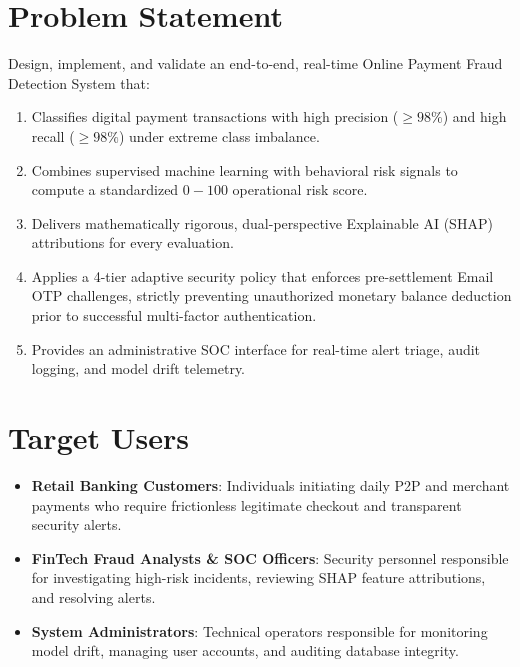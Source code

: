 \section{Problem Statement}
\begin{tcolorbox}[colback=lightgraybg, colframe=primaryblue, title=\textbf{\color{white}Formal Engineering Problem Statement}, arc=3pt]
Design, implement, and validate an end-to-end, real-time Online Payment Fraud Detection System that:
\begin{enumerate}[label=(\roman*)]
    \item Classifies digital payment transactions with high precision ($\ge 98\%$) and high recall ($\ge 98\%$) under extreme class imbalance.
    \item Combines supervised machine learning with behavioral risk signals to compute a standardized $0-100$ operational risk score.
    \item Delivers mathematically rigorous, dual-perspective Explainable AI (SHAP) attributions for every evaluation.
    \item Applies a 4-tier adaptive security policy that enforces pre-settlement Email OTP challenges, strictly preventing unauthorized monetary balance deduction prior to successful multi-factor authentication.
    \item Provides an administrative SOC interface for real-time alert triage, audit logging, and model drift telemetry.
\end{enumerate}
\end{tcolorbox}

\section{Target Users}
\begin{itemize}
    \item \textbf{Retail Banking Customers}: Individuals initiating daily P2P and merchant payments who require frictionless legitimate checkout and transparent security alerts.
    \item \textbf{FinTech Fraud Analysts \& SOC Officers}: Security personnel responsible for investigating high-risk incidents, reviewing SHAP feature attributions, and resolving alerts.
    \item \textbf{System Administrators}: Technical operators responsible for monitoring model drift, managing user accounts, and auditing database integrity.
\end{itemize}
